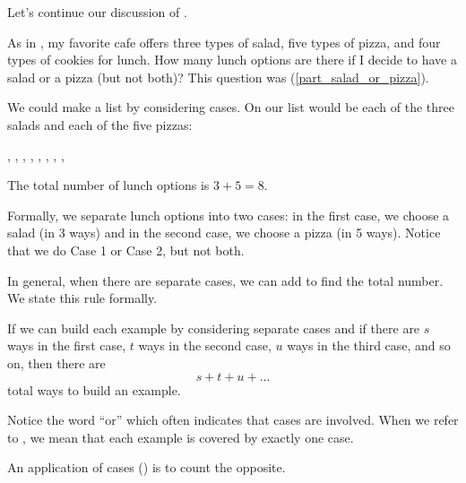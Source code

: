Let's continue our discussion of .

\begin{exam} 
\label{exam_salad_or_pizza}
    As in , my favorite cafe offers three types of salad, five types of pizza, and four types of cookies for lunch. How many lunch options are there if I decide to have a salad or a pizza (but not both)? This question was (\ref{part_salad_or_pizza}).
    \begin{soln}
        We could make a list by considering cases. On our list would be each of the three salads and each of the five pizzas:  
        \begin{center}
            , , , , , , , , 
        \end{center}
        The total number of lunch options is $3 + 5 = 8$.

        Formally, we separate lunch options into two cases: in the first case, we choose a salad (in 3 ways) and in the second case, we choose a pizza (in 5 ways). 
        Notice that we do Case 1 or Case 2, but not both.        
    \end{soln}
\end{exam}

In general, when there are separate cases, we can add to find the total number.  We state this rule formally.

\begin{thm}
\label{thm_cases_add}
   If we can build each example by considering separate cases and if there are $s$ ways in the first case, $t$ ways in the second case, $u$ ways in the third case, and so on, then there are $$s + t + u + \ldots$$ total ways to build an example.   
\end{thm}

Notice the word ``or'' which often indicates that cases are involved.  When we refer to , we mean that each example is covered by exactly one case.

An application of cases () is to count the opposite.

